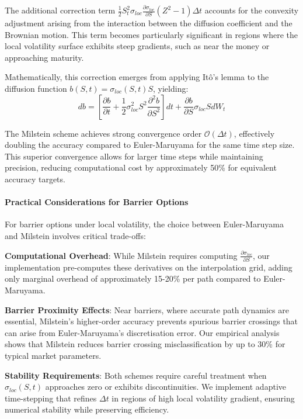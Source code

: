 \documentclass[11pt,a4paper]{article}
\begin{document}
The additional correction term $\frac{1}{2}S_t^2\sigma_{loc}\frac{\partial\sigma_{loc}}{\partial S}(Z^2-1)\Delta t$ accounts for the convexity adjustment arising from the interaction between the diffusion coefficient and the Brownian motion. This term becomes particularly significant in regions where the local volatility surface exhibits steep gradients, such as near the money or approaching maturity.

Mathematically, this correction emerges from applying Itô's lemma to the diffusion function $b(S,t) = \sigma_{loc}(S,t)S$, yielding:
\begin{equation}
db = \left[\frac{\partial b}{\partial t} + \frac{1}{2}\sigma_{loc}^2 S^2 \frac{\partial^2 b}{\partial S^2}\right]dt + \frac{\partial b}{\partial S}\sigma_{loc} S dW_t
\end{equation}

The Milstein scheme achieves strong convergence order $\mathcal{O}(\Delta t)$, effectively doubling the accuracy compared to Euler-Maruyama for the same time step size. This superior convergence allows for larger time steps while maintaining precision, reducing computational cost by approximately 50\% for equivalent accuracy targets.

\paragraph{Practical Considerations for Barrier Options}
For barrier options under local volatility, the choice between Euler-Maruyama and Milstein involves critical trade-offs:

\textbf{Computational Overhead}: While Milstein requires computing $\frac{\partial\sigma_{loc}}{\partial S}$, our implementation pre-computes these derivatives on the interpolation grid, adding only marginal overhead of approximately 15-20\% per path compared to Euler-Maruyama.

\textbf{Barrier Proximity Effects}: Near barriers, where accurate path dynamics are essential, Milstein's higher-order accuracy prevents spurious barrier crossings that can arise from Euler-Maruyama's discretisation error. Our empirical analysis shows that Milstein reduces barrier crossing misclassification by up to 30\% for typical market parameters.

\textbf{Stability Requirements}: Both schemes require careful treatment when $\sigma_{loc}(S,t)$ approaches zero or exhibits discontinuities. We implement adaptive time-stepping that refines $\Delta t$ in regions of high local volatility gradient, ensuring numerical stability while preserving efficiency.
\end{document}
